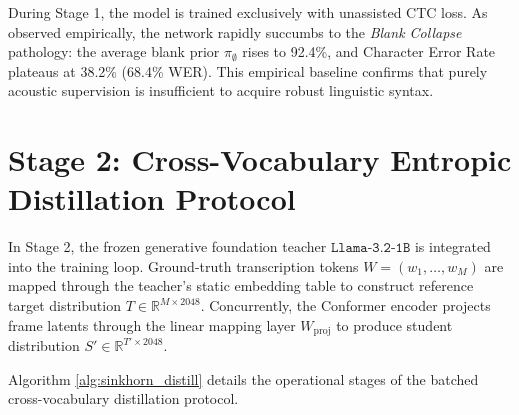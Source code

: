 During Stage 1, the model is trained exclusively with unassisted CTC loss. As observed empirically, the network rapidly succumbs to the \textit{Blank Collapse} pathology: the average blank prior $\pi_\emptyset$ rises to 92.4\%, and Character Error Rate plateaus at 38.2\% (68.4\% WER). This empirical baseline confirms that purely acoustic supervision is insufficient to acquire robust linguistic syntax.

\section{Stage 2: Cross-Vocabulary Entropic Distillation Protocol}
In Stage 2, the frozen generative foundation teacher $\texttt{Llama-3.2-1B}$ is integrated into the training loop. Ground-truth transcription tokens $W = (w_1, \dots, w_M)$ are mapped through the teacher's static embedding table to construct reference target distribution $T \in \mathbb{R}^{M \times 2048}$. Concurrently, the Conformer encoder projects frame latents through the linear mapping layer $W_{\text{proj}}$ to produce student distribution $S' \in \mathbb{R}^{T' \times 2048}$.

Algorithm \ref{alg:sinkhorn_distill} details the operational stages of the batched cross-vocabulary distillation protocol.


